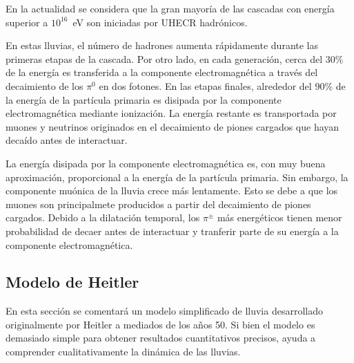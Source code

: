 En la actualidad se considera que la gran mayoría de las cascadas con energía superior a $10^{16}$~eV son iniciadas por UHECR hadrónicos. 
%

En estas lluvias, el número de hadrones aumenta rápidamente durante las primeras etapas de la cascada. Por otro lado, en cada generación, cerca del 30\% de la energía es transferida a la componente electromagnética a través del decaimiento de los $\pi^{0}$ en dos fotones. En las etapas finales, alrededor del 90\% de la energía de la partícula primaria es disipada por la componente electromagnética mediante ionización. La energía restante es transportada por muones y neutrinos originados en el decaimiento de piones cargados que hayan decaído antes de interactuar.

La energía disipada por la componente electromagnética es, con muy buena aproximación, proporcional a la energía de la partícula primaria. Sin embargo, la componente muónica de la lluvia crece más lentamente. Esto se debe a que los muones son principalmete producidos a partir del decaimiento de piones cargados. Debido a la dilatación temporal, los $\pi^{\pm}$ más energéticos tienen menor probabilidad de decaer antes de interactuar y tranferir parte de su energía a la componente electromagnética.


\subsection{Modelo de Heitler}
En esta sección se comentará un modelo simplificado de lluvia desarrollado originalmente por Heitler \cite{hei54} a mediados de los años 50. Si bien el modelo es demasiado simple para obtener resultados cuantitativos precisos, ayuda a comprender cualitativamente la dinámica de las lluvias.

